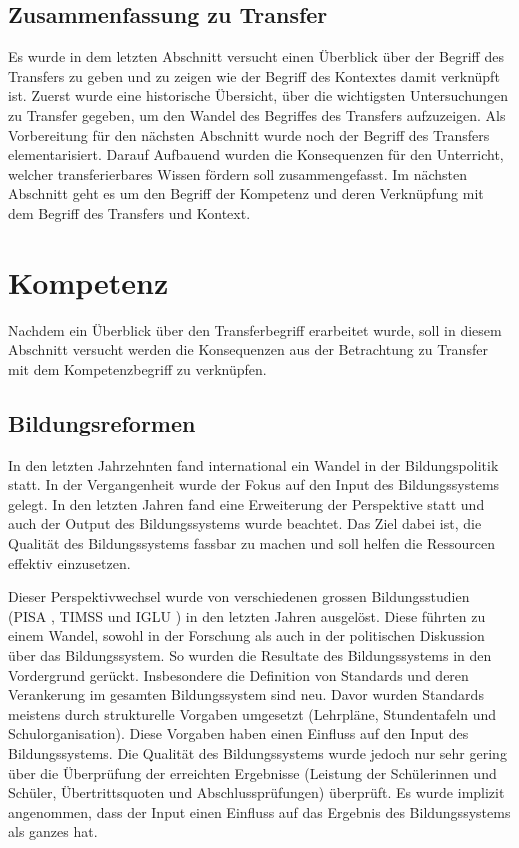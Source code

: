 \subsection{Zusammenfassung zu Transfer}

Es wurde in dem letzten Abschnitt versucht einen Überblick über der Begriff des Transfers zu geben und zu zeigen wie der Begriff des Kontextes damit verknüpft ist. Zuerst wurde eine historische Übersicht, über die wichtigsten Untersuchungen zu Transfer gegeben, um den Wandel des Begriffes des Transfers aufzuzeigen.  Als Vorbereitung für den nächsten Abschnitt wurde noch der Begriff des Transfers elementarisiert. Darauf Aufbauend wurden die Konsequenzen für den Unterricht, welcher transferierbares Wissen fördern soll zusammengefasst. Im nächsten Abschnitt geht es um den Begriff der Kompetenz und deren Verknüpfung mit dem Begriff des Transfers und Kontext.


\section{Kompetenz}

Nachdem ein Überblick über den Transferbegriff erarbeitet wurde, soll in diesem Abschnitt versucht werden die Konsequenzen aus der Betrachtung zu Transfer mit dem Kompetenzbegriff zu verknüpfen.

\subsection{Bildungsreformen}
In den letzten Jahrzehnten fand international ein Wandel in der Bildungspolitik statt. In der Vergangenheit wurde der Fokus auf den Input des Bildungssystems gelegt. In den letzten Jahren fand eine Erweiterung der Perspektive statt und auch der Output des Bildungssystems wurde beachtet. Das Ziel dabei ist, die Qualität des Bildungssystems fassbar zu machen und soll helfen die Ressourcen effektiv einzusetzen.

Dieser Perspektivwechsel wurde von verschiedenen grossen Bildungsstudien (PISA \citep{PISA-KonsortiumDeuschland2004}, TIMSS \citep{Martin2003} und IGLU \citep{Bos2003}) in den letzten Jahren ausgelöst. Diese führten zu einem Wandel, sowohl in der Forschung als auch in der politischen Diskussion über das Bildungssystem. So wurden die Resultate des Bildungssystems in den Vordergrund gerückt. Insbesondere die Definition von Standards und deren Verankerung im gesamten Bildungssystem sind neu. Davor wurden Standards meistens durch strukturelle Vorgaben umgesetzt (Lehrpläne, Stundentafeln und Schulorganisation). Diese Vorgaben haben einen Einfluss auf den Input des Bildungssystems. Die Qualität des Bildungssystems wurde jedoch nur sehr gering über die Überprüfung der erreichten Ergebnisse (Leistung der Schülerinnen und Schüler, Übertrittsquoten und Abschlussprüfungen) überprüft. Es wurde implizit angenommen, dass der Input einen Einfluss auf das Ergebnis des Bildungssystems als ganzes hat. 


